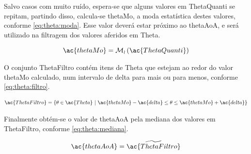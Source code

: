 Salvo casos com muito ruído, espera-se que alguns valores em \ac{ThetaQuanti} se repitam, partindo disso, calcula-se \ac{thetaMo}, a moda estatística destes valores, conforme \autoref{eq:theta:moda}.
Esse valor deverá estar próximo ao \ac{thetaAoA}, e será utilizado na filtragem dos valores aferidos em \ac{Theta}.

\begin{equation} \label{eq:theta:moda}
    \ac{thetaMo} = \operatorname{\mathcal{M_o}}\left( \ac{ThetaQuanti}  \right)
\end{equation}

O conjunto \ac{ThetaFiltro} contém itens de \ac{Theta} que estejam ao redor do valor \ac{thetaMo} calculado, num intervalo de \ac{delta} para mais ou para menos, conforme \autoref{eq:theta:filtro}.


\begin{equation} \label{eq:theta:filtro}
    \ac{ThetaFiltro} = \left\{\theta \in \ac{Theta}  ~\middle\vert~
    \ac{thetaMo} - \ac{delta} \leq \theta \leq \ac{thetaMo} + \ac{delta}\right\}
\end{equation}

Finalmente obtém-se o valor de \ac{thetaAoA} pela mediana dos valores em \ac{ThetaFiltro}, conforme \autoref{eq:theta:mediana}.

\begin{equation} \label{eq:theta:mediana}
    \ac{thetaAoA} = \widetilde{\ac{ThetaFiltro}}
\end{equation}


